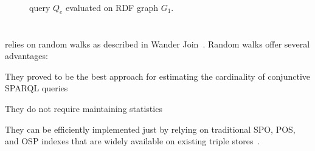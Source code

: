 \begin{figure}[t]
  \centering
  \begin{minipage}{0.49\textwidth}
    \subfloat[$(Q_e$]{
      
      \label{fig:q1-j2-1hop}
    } \\
  \end{minipage}
  \hfill
  \begin{minipage}{0.50\textwidth}
  \end{minipage}
  \caption{
    query $Q_e$  evaluated on RDF graph $G_1$.
  }
  \label{fig:random_walks_example}
\end{figure}



\section{\NAME}

\NAME relies on random walks as described in Wander
Join~\cite{li2019wanderjoin}. Random walks offer several advantages:
\begin{inparaenum}[(1)]
  \item They proved to be the best approach for estimating the cardinality
    of conjunctive SPARQL queries~\cite{park2020g}
  \item They do not require maintaining statistics~\cite{gubichev2015query}
  \item They can be efficiently implemented just by relying on
    traditional SPO, POS, and OSP indexes that are widely available on
    existing triple stores~\cite{DBLP:conf/cidr/LeisRGK017}.
\end{inparaenum}


